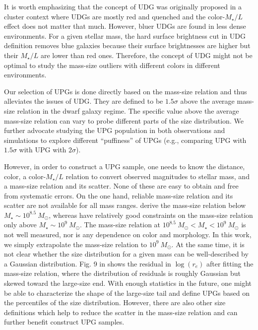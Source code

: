 \documentclass[twocolumn,astrosymb,twocolappendix]{aastex631}
\begin{document}
\begin{CJK*}{UTF8}{gbsn}
It is worth emphasizing that the concept of UDG was originally proposed in a cluster context where UDGs are mostly red and quenched \citep[e.g.,][]{vanDokkum2015} and the color-$M_\star/L$ effect does not matter that much. However, bluer UDGs are found in less dense environments. For a given stellar mass, the hard surface brightness cut in UDG definition removes blue galaxies because their surface brightnesses are higher but their $M_\star/L$ are lower than red ones. Therefore, the concept of UDG might not be optimal to study the mass-size outliers with different colors in different environments.

Our selection of UPGs is done directly based on the mass-size relation and thus alleviates the issues of UDG. They are defined to be $1.5\sigma$ above the average mass-size relation in the dwarf galaxy regime. The specific value above the average mass-size relation can vary to probe different parts of the size distribution. We further advocate studying the UPG population in both observations and simulations to explore different ``puffiness'' of UPGs (e.g., comparing UPG with $1.5\sigma$ with UPG with $2\sigma$). 

However, in order to construct a UPG sample, one needs to know the distance, color, a color-$M_\star/L$ relation to convert observed magnitudes to stellar mass, and a mass-size relation and its scatter. None of these are easy to obtain and free from systematic errors. On the one hand, reliable mass-size relation and its scatter are not available for all mass ranges. \citet{ELVES-I} derive the mass-size relation below $M_\star \sim 10^{8.5}\ M_\odot$, whereas \citet{Lange2015} have relatively good constraints on the mass-size relation only above $M_\star \sim 10^{9}\ M_\odot$. The mass-size relation at $10^{8.5}\ M_\odot < M_\star < 10^{9}\ M_\odot$ is not well measured, nor is any dependence on color and morphology. In this work, we simply extrapolate the \citet{ELVES-I} mass-size relation to $10^9\ M_\odot$. At the same time, it is not clear whether the size distribution for a given mass can be well-described by a Gaussian distribution. Fig. 9 in \citet{ELVES-I} shows the residual in $\log(r_e)$ after fitting the mass-size relation, where the distribution of residuals is roughly Gaussian but skewed toward the large-size end. With enough statistics in the future, one might be able to characterize the shape of the large-size tail and define UPGs based on the percentiles of the size distribution. However, there are also other size definitions which help to reduce the scatter in the mass-size relation \citep[e.g.,][]{Miller2019,Mowla2019,Trujillo2020,Chamba2022} and can further benefit construct UPG samples.


\end{CJK*}
\end{document}
